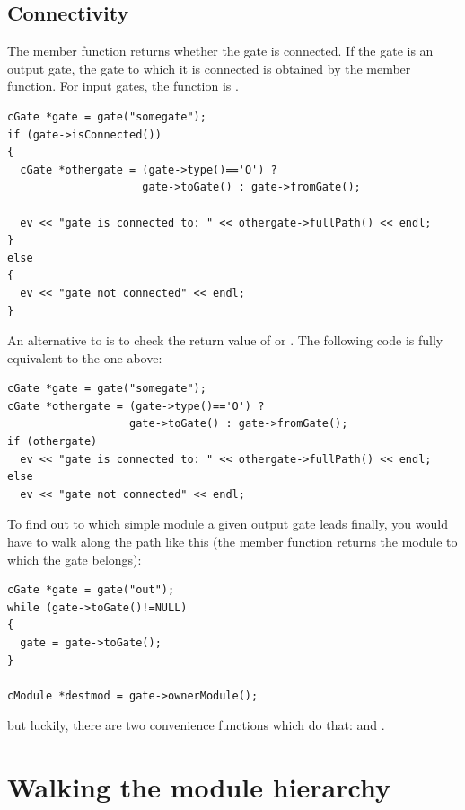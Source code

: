 \subsection{Connectivity}

The  member function returns whether
the gate is connected. If the gate is an output gate, the gate to
which it is connected is obtained by the 
member function. For input gates, the function is
.

%
%

\begin{verbatim}
cGate *gate = gate("somegate");
if (gate->isConnected())
{
  cGate *othergate = (gate->type()=='O') ?
                     gate->toGate() : gate->fromGate();

  ev << "gate is connected to: " << othergate->fullPath() << endl;
}
else
{
  ev << "gate not connected" << endl;
}
\end{verbatim}


An alternative to  is to check the return value
of  or . The following code is fully equivalent
to the one above:

\begin{verbatim}
cGate *gate = gate("somegate");
cGate *othergate = (gate->type()=='O') ?
                   gate->toGate() : gate->fromGate();
if (othergate)
  ev << "gate is connected to: " << othergate->fullPath() << endl;
else
  ev << "gate not connected" << endl;
\end{verbatim}

To find out to which simple module a given output
gate leads finally, you would have to walk
along the path like this (the  member function
returns the module to which the gate belongs):

\begin{verbatim}
cGate *gate = gate("out");
while (gate->toGate()!=NULL)
{
  gate = gate->toGate();
}

cModule *destmod = gate->ownerModule();
\end{verbatim}


but luckily, there are two convenience functions which do that:
 and
.





\section{Walking the module hierarchy}
\label{ch:simple-modules:walking-module-hieararchy}

